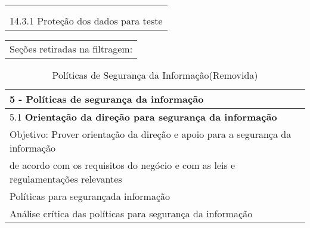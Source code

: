 \documentclass[portuguese,oneside]{tcc}
\begin{document}
\begin{table}[!t]
\begin{center}
\begin{tabular}{|l|l|l|l|l|l|}
\multicolumn{6}{|l|}{}                                                                                                                                                                                                                                                                                                                                                           \\
\multicolumn{6}{|l|}{}                                                                                                                                                                                                                                                                                                                                                           \\ \hline
\multicolumn{6}{|l|}{14.3.1 Proteção dos dados para teste}                                                                                                                                                                                                                                                                                                                       \\ \hline
\end{tabular}
\end{center}
\end{table}
 
 
 
\begin{table}[!t]
\begin{tabular}{l}
Seções retiradas na filtragem:
\end{tabular}
\end{table}


\begin{table}[!t]
\begin{center}
\caption{\label{tab:tab5}Políticas de Segurança da Informação(Removida)}%
\begin{tabular}{|l|}
\hline
5 - \textbf{Políticas de segurança da informação }                          \\ \hline
5.1\textbf{ Orientação da direção para segurança da informação} \\
Objetivo: Prover orientação da direção e apoio para a  segurança da informação \\ de acordo
com os requisitos do negócio e com as leis e regulamentações relevantes            \\ \hline
 Políticas para segurançada informação                      \\ \hline
 Análise crítica das políticas para segurança da informação \\ \hline
\end{tabular}
\end{center}
\end{table}
\end{document}
